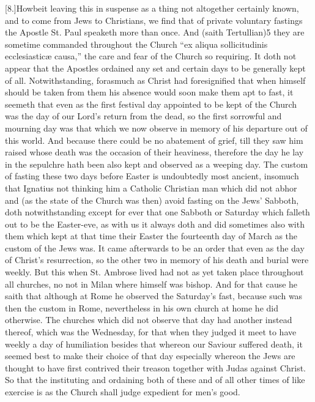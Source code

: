 [8.]Howbeit leaving this in suspense as a thing not altogether certainly known, and to come from Jews to Christians, we find that of private voluntary fastings the Apostle St. Paul speaketh more than once. And (saith Tertullian)5 they are sometime commanded throughout the Church “ex aliqua sollicitudinis ecclesiasticæ causa,” the care and fear of the Church so requiring. It doth not appear that the Apostles ordained any set and certain days to be generally kept of all. Notwithstanding, forasmuch as Christ had foresignified that when himself should be taken from them his absence would soon make them apt to fast, it seemeth that even as the first festival day appointed to be kept of the Church was the day of our Lord’s return from the dead, so the first sorrowful and mourning day was that which we now observe in memory of his departure out of this world. And because there could be  no abatement of grief, till they saw him raised whose death was the occasion of their heaviness, therefore the day he lay in the sepulchre hath been also kept and observed as a weeping day. The custom of fasting these two days before Easter is undoubtedly most ancient, insomuch that Ignatius not thinking him a Catholic Christian man which did not abhor and (as the state of the Church was then) avoid fasting on the Jews’ Sabboth, doth notwithstanding except for ever that one Sabboth or Saturday which falleth out to be the Easter-eve, as with us it always doth and did sometimes also with them which kept at that time their Easter the fourteenth day of March as the custom of the Jews was. It came afterwards to be an order that even as the day of Christ’s resurrection, so the other two in memory of his death and burial were weekly. But this when St. Ambrose lived had not as yet taken place throughout all churches, no not in Milan where himself was bishop. And for that cause he saith that although at Rome he observed the Saturday’s fast, because such was then the custom in Rome, nevertheless in his own church at home he did otherwise. The churches  which did not observe that day had another instead thereof, which was the Wednesday,
 for that when they judged it meet to have weekly a day of humiliation besides that whereon our Saviour suffered death, it seemed best to make their choice of that day especially whereon the Jews are thought to have first contrived their treason together with Judas against Christ. So that the instituting and ordaining both of these and of all other times of like exercise is as the Church shall judge expedient for men’s good.


